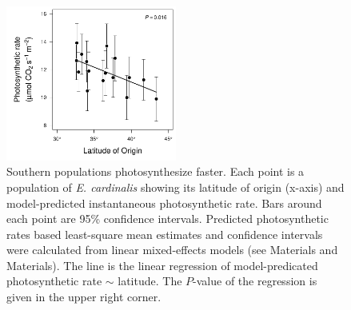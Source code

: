 \documentclass[11pt, oneside]{article}
\begin{document}
\begin{figure}[h!]
	\centerline{\includegraphics[width=0.5\textwidth]{Figures/FigureS_Photolat.pdf}}
	\fontsize{10}{12}
	\selectfont
	\caption[Southern populations photosynthesize faster]{Southern populations photosynthesize faster. Each point is a population of \textit{E. cardinalis} showing its latitude of origin (x-axis) and model-predicted instantaneous photosynthetic rate. Bars around each point are 95\% confidence intervals. Predicted photosynthetic rates based least-square mean estimates and confidence intervals were calculated from linear mixed-effects models (see Materials and Materials). The line is the linear regression of model-predicated photosynthetic rate $\sim$ latitude. The $P$-value of the regression is given in the upper right corner.}
	\label{fig:FigS_Photolat}
\end{figure}

\end{document}

